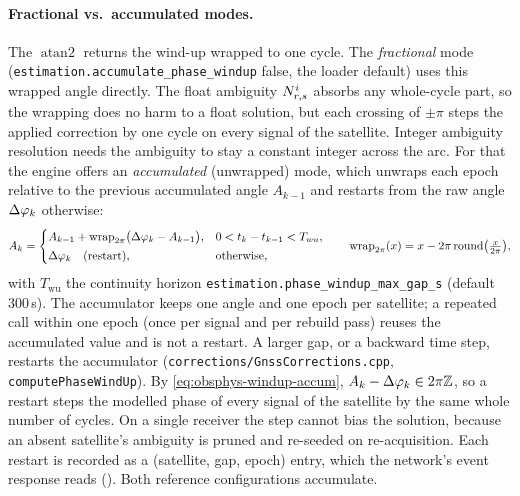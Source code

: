 \documentclass[main.tex]{subfiles}
\begin{document}
\paragraph{Fractional vs.\ accumulated modes.}
The $\operatorname{atan2}$ returns the wind-up wrapped to one cycle.  The
\emph{fractional} mode (\texttt{estimation.accumulate\_phase\_windup}
false, the loader default) uses this wrapped angle directly.  The
float ambiguity $N^i_{r,s}$ absorbs any whole-cycle part, so
the wrapping does no harm to a float solution, but each crossing of
$\pm\pi$ steps the applied correction by one cycle on every signal of the
satellite.  Integer ambiguity resolution needs the
ambiguity to stay a constant integer across the arc.  For that the
engine offers an \emph{accumulated} (unwrapped) mode, which unwraps each
epoch relative to the previous accumulated angle $A_{k-1}$ and restarts
from the raw angle $\Delta\varphi_k$ otherwise:
\begin{equation}
A_k =
\begin{cases}
A_{k-1} + \operatorname{wrap}_{2\pi}\!\big(\Delta\varphi_k - A_{k-1}\big),
 & 0 < t_k - t_{k-1} < T_{wu},\\[2pt]
\Delta\varphi_k \quad\text{(restart)}, & \text{otherwise,}
\end{cases}
\qquad
\operatorname{wrap}_{2\pi}(x) = x - 2\pi\operatorname{round}\!\big(\tfrac{x}{2\pi}\big),
\label{eq:obsphys-windup-accum}
\end{equation}
with $T_{\mathrm{wu}}$ the continuity horizon
\texttt{estimation.phase\_windup\_max\_gap\_s} (default $300$\,s).  The
accumulator keeps one angle and one epoch per satellite; a repeated call
within one epoch (once per signal and per rebuild pass) reuses the
accumulated value and is not a restart.  A larger gap, or a backward time
step, restarts the accumulator
(\texttt{corrections/GnssCorrections.cpp}, \texttt{computePhaseWindUp}).
By \eqref{eq:obsphys-windup-accum}, $A_k-\Delta\varphi_k\in2\pi\mathbb{Z}$, so
a restart steps the modelled phase of every signal of the satellite by
the same whole number of cycles.  On a single receiver the step cannot
bias the solution, because an absent satellite's ambiguity is pruned and
re-seeded on re-acquisition.  Each restart is recorded as a
(satellite, gap, epoch) entry, which the network's event response reads
().  Both reference configurations accumulate.
\end{document}
